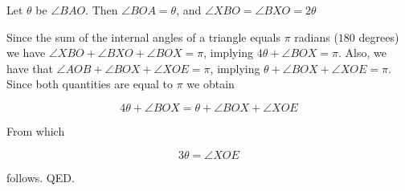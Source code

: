 Let $\theta$ be $\angle BAO$.
Then $\angle BOA = \theta$, and $\angle XBO = \angle BXO= 2\theta$

Since the sum of the internal angles of a triangle equals $\pi$
radians ($180$ degrees) we have $ \angle XBO + \angle BXO + \angle BOX
= \pi$, implying $4 \theta + \angle BOX = \pi$.  Also, we have that
$\angle AOB + \angle BOX + \angle XOE = \pi$, implying $\theta +\angle
BOX + \angle XOE = \pi$. Since both quantities are equal to $\pi$
we obtain

\[ 4 \theta + \angle BOX = \theta +\angle BOX + \angle XOE \]

From which

\[ 3 \theta = \angle XOE \]

follows. QED.


